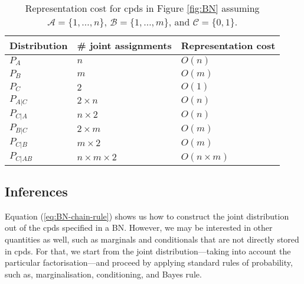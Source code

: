 \begin{table}[h]\centering
\begin{tabular}{l l l}
Distribution & \# joint assignments & Representation cost \\ \hline
$P_A$ & $n$ & $O(n)$ \\ 
$P_B$ & $m$ & $O(m)$ \\
$P_C$ & $2$ & $O(1)$ \\
$P_{A|C}$ & $2\times n$ & $O(n)$ \\
$P_{C|A}$ & $n \times 2$ & $O(n)$ \\
$P_{B|C}$ & $2 \times m$ & $O(m)$ \\
$P_{C|B}$ & $m \times 2$ & $O(m)$ \\
$P_{C|AB}$ & $n \times m \times 2$ & $O(n \times m)$
\end{tabular}
\caption{\label{tab:cost}Representation cost for cpds in Figure \ref{fig:BN} assuming $\mathcal A=\{1, \ldots, n\}$, $\mathcal B =\{1, \ldots, m\}$, and $\mathcal C =\{0, 1\}$.}
\end{table}
	
	
\subsection{Inferences}	

Equation (\ref{eq:BN-chain-rule}) shows us how to construct the joint distribution out of the cpds specified in a BN.
However, we may be interested in other quantities as well, such as marginals and conditionals that are not directly stored in cpds. 
For that, we start from the joint distribution---taking into account the particular factorisation---and proceed by applying standard rules of probability, such as, marginalisation, conditioning, and Bayes rule. 

